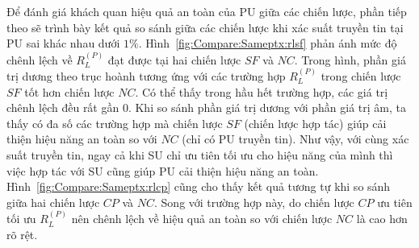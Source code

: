 \documentclass[../main.tex]{subfiles}
\begin{document}
Để đánh giá khách quan hiệu quả an toàn của PU giữa các chiến lược, phần tiếp theo sẽ trình bày kết quả so sánh giữa các chiến lược khi xác suất truyền tin tại PU sai khác nhau dưới $1\%$. Hình~\ref{fig:Compare:Sameptx:rlsf} phản ánh mức độ chênh lệch về $R_L^{(P)}$ đạt được tại hai chiến lược $SF$ và $NC$. Trong hình, phần giá trị dương theo trục hoành tương ứng với các trường hợp $R_L^{(P)}$ trong chiến lược $SF$ tốt hơn chiến lược $NC$. Có thể thấy trong hầu hết trường hợp, các giá trị chênh lệch đều rất gần $0$. Khi so sánh phần giá trị dương với phần giá trị âm, ta thấy có đa số các trường hợp mà chiến lược $SF$ (chiến lược hợp tác) giúp cải thiện hiệu năng an toàn so với $NC$ (chỉ có PU truyền tin). Như vậy, với cùng xác suất truyền tin, ngay cả khi SU chỉ ưu tiên tối ưu cho hiệu năng của mình thì việc hợp tác với SU cũng giúp PU cải thiện hiệu năng an toàn. Hình~\ref{fig:Compare:Sameptx:rlcp} cũng cho thấy kết quả tương tự khi so sánh giữa hai chiến lược $CP$ và $NC$. Song với trường hợp này, do chiến lược $CP$ ưu tiên tối ưu $R_L^{(P)}$ nên chênh lệch về hiệu quả an toàn so với chiến lược $NC$ là cao hơn rõ rệt.
\end{document}
